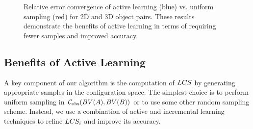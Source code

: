 \begin{figure}[t]
\begin{center}
\end{center}
\caption[Relative error convergence of active learning vs. uniform sampling for 2D and 3D object pairs]{Relative error convergence of active learning (blue) vs. uniform sampling (red) for 2D and 3D object pairs. These results demonstrate the benefits of active learning in terms of requiring fewer samples and improved accuracy.}
\label{fig:2:activelearningtime}
\end{figure}

\subsection{Benefits of Active Learning}
A key component of our algorithm is the computation of $LCS$ by generating appropriate samples in the configuration space. The simplest choice is to perform uniform sampling in $\mathcal C_{\text{obs}} (BV(A),BV(B))$ or to use some other random sampling scheme. Instead, we use a combination of active and incremental learning techniques to refine $LCS_i$ and improve its accuracy.


